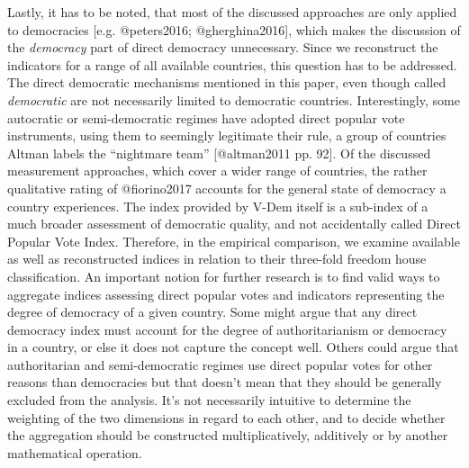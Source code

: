 \documentclass[]{article}
\begin{document}
Lastly, it has to be noted, that most of the discussed approaches are
only applied to democracies {[}e.g. @peters2016; @gherghina2016{]},
which makes the discussion of the \emph{democracy} part of direct
democracy unnecessary. Since we reconstruct the indicators for a range
of all available countries, this question has to be addressed. The
direct democratic mechanisms mentioned in this paper, even though called
\emph{democratic} are not necessarily limited to democratic countries.
Interestingly, some autocratic or semi-democratic regimes have adopted
direct popular vote instruments, using them to seemingly legitimate
their rule, a group of countries Altman labels the ``nightmare team''
{[}@altman2011 pp. 92{]}. Of the discussed measurement approaches, which
cover a wider range of countries, the rather qualitative rating of
@fiorino2017 accounts for the general state of democracy a country
experiences. The index provided by V-Dem itself is a sub-index of a much
broader assessment of democratic quality, and not accidentally called
Direct Popular Vote Index. Therefore, in the empirical comparison, we
examine available as well as reconstructed indices in relation to their
three-fold freedom house classification. An important notion for further
research is to find valid ways to aggregate indices assessing direct
popular votes and indicators representing the degree of democracy of a
given country. Some might argue that any direct democracy index must
account for the degree of authoritarianism or democracy in a country, or
else it does not capture the concept well. Others could argue that
authoritarian and semi-democratic regimes use direct popular votes for
other reasons than democracies but that doesn't mean that they should be
generally excluded from the analysis. It's not necessarily intuitive to
determine the weighting of the two dimensions in regard to each other,
and to decide whether the aggregation should be constructed
multiplicatively, additively or by another mathematical operation.
\end{document}
